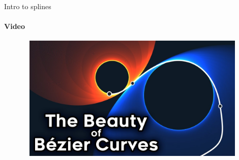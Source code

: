 \documentclass[aspectratio=169,notes]{beamer}
\begin{document}
\begin{frame}[t]{Intro to splines}
    \framesubtitle{Video}
    \vspace{-0.6cm}
    \begin{figure}[H]
        \href{https://youtu.be/aVwxzDHniEw}{
            \centering\includegraphics[height=6cm,width=1\textwidth,keepaspectratio]{beauty_of_bezier_video.jpg}}
        \label{fig:beauty_of_bezier_video.jpg}
    \end{figure}
\end{frame}
\end{document}
